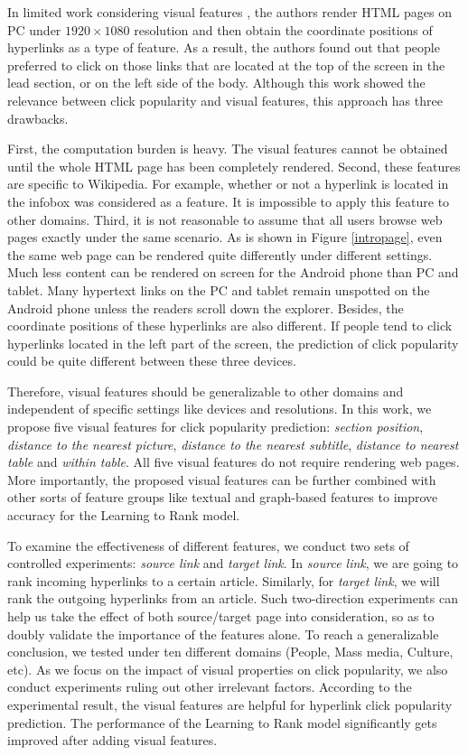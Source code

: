 In limited work considering visual features \cite{dimitrov2016visual, dimitrov2017makes}, the authors render HTML pages on PC under $1920 \times 1080$ resolution and then obtain the coordinate positions of hyperlinks as a type of feature. As a result, the authors found out that people preferred to click on those links that are located at the top of the screen in the lead section, or on the left side of the body. Although this work showed the relevance between click popularity and visual features, this approach has three drawbacks. 

First, the computation burden is heavy. The visual features cannot be obtained until the whole HTML page has been completely rendered. Second, these features are specific to Wikipedia. For example, whether or not a hyperlink is located in the infobox was considered as a feature. It is impossible to apply this feature to other domains. Third, it is not reasonable to assume that all users browse web pages exactly under the same scenario. As is shown in Figure \ref{intropage}, even the same web page can be rendered quite differently under different settings. Much less content can be rendered on screen for the Android phone than PC and tablet. Many hypertext links on the PC and tablet remain unspotted on the Android phone unless the readers scroll down the explorer. Besides, the coordinate positions of these hyperlinks are also different. If people tend to click hyperlinks located in the left part of the screen, the prediction of click popularity could be quite different between these three devices.

Therefore, visual features should be generalizable to other domains and independent of specific settings like devices and resolutions. In this work, we propose five visual features for click popularity prediction: \emph{section position}, \emph{distance to the nearest picture}, \emph{distance to the nearest subtitle}, \emph{distance to nearest table} and \emph{within table}. All five visual features do not require rendering web pages. More importantly, the proposed visual features can be further combined with other sorts of feature groups like textual and graph-based features \cite{thruesen2016link, dimitrov2017makes} to improve accuracy for the Learning to Rank model.

To examine the effectiveness of different features, we conduct two sets of controlled experiments: \emph{source link} and \emph{target link}. In \emph{source link}, we are going to rank incoming hyperlinks to a certain article. Similarly, for \emph{target link}, we will rank the outgoing hyperlinks from an article. Such two-direction experiments can help us take the effect of both source/target page into consideration, so as to doubly validate the importance of the features alone. To reach a generalizable conclusion, we tested under ten different domains (People, Mass media, Culture, etc). As we focus on the impact of visual properties on click popularity, we also conduct experiments ruling out other irrelevant factors. According to the experimental result, the visual features are helpful for hyperlink click popularity prediction. The performance of the Learning to Rank model significantly gets improved after adding visual features.

